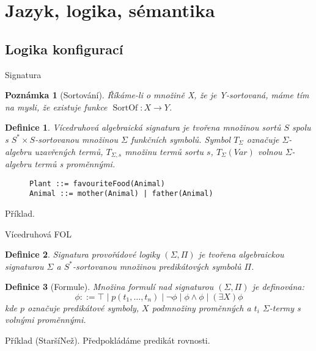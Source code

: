 \documentclass[11pt]{beamer}
\newtheorem{dfn}{Definice}
\newtheorem{pozn}{Poznámka}
\DeclareMathOperator{\SortOf}{SortOf}
\begin{document}
\section{Jazyk, logika, sémantika}

\subsection{Logika konfigurací}

\begin{frame}[fragile]{Signatura}

\begin{pozn}[Sortování]
Říkáme-li o množině X, že je Y-sortovaná, máme tím na mysli, že existuje funkce $\SortOf : X \rightarrow Y $.
\end{pozn}

\pause

\begin{dfn}
\textit{Vícedruhová algebraická signatura} je tvořena množinou sortů $S$ spolu s $S^* \times S$-sortovanou množinou $\Sigma$ funkčních symbolů. Symbol $T_{\Sigma}$ označuje $\Sigma$-algebru uzavřených termů, $T_{\Sigma , s}$ množinu termů sortu $s$, $T_{\Sigma}\left( Var \right)$ volnou $\Sigma$-algebru termů s proměnnými.
\end{dfn}

\pause

\begin{figure}
\begin{lstlisting}
Plant ::= favouriteFood(Animal)
Animal ::= mother(Animal) | father(Animal)
\end{lstlisting}
\end{figure}

\pause

Příklad.

\end{frame}


\begin{frame}{Vícedruhová FOL}

\begin{dfn}
Signatura provořádové logiky $\left( \Sigma, \Pi \right)$ je tvořena algebraickou signaturou $\Sigma$ a $S^*$-sortovanou množinou predikátových symbolů $\Pi$.
\end{dfn}

\pause

\begin{dfn}[Formule]
Množina formulí nad signaturou $\left( \Sigma, \Pi \right)$ je definována:
\begin{equation*}
\phi ::= \top \mid p(t_1,\ldots,t_n) \mid \neg \phi \mid \phi \land \phi \mid \left( \exists X \right) \phi
\end{equation*}
kde $p$ označuje predikátové symboly, $X$ podmnožiny proměnných a $t_i$ $\Sigma$-termy s volnými proměnnými.
\end{dfn}

\pause
Příklad (StaršíNež).
\pause
Předpokládáme predikát rovnosti.

\end{frame}
\end{document}
